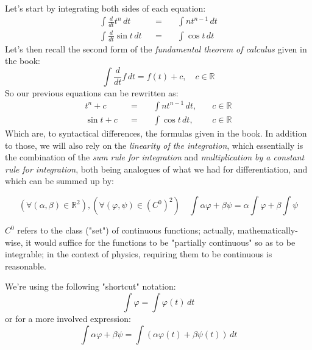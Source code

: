 \documentclass[solutions.tex]{subfiles}
\begin{document}
Let's start by integrating both sides of each equation:
\begin{equation*} \begin{aligned}
	\int\frac{d}{dt}t^n\,dt &&=\quad& \int nt^{n-1}\,dt \\
	\int\frac{d}{dt}\sin t\,dt &&=\quad& \int\cos t\,dt
\end{aligned} \end{equation*}
Let's then recall the second form of the \textit{fundamental
theorem of calculus} given in the book:
\[
	\int\frac{d}{dt}f\,dt = f(t) + c,\quad c\in\mathbb{R}
\]
So our previous equations can be rewritten as:
\begin{equation*} \begin{aligned}
	t^n + c &&=\quad& \int nt^{n-1}\,dt,&\quad c\in\mathbb{R} \\
	\sin t + c &&=\quad& \int\cos t\,dt,&\quad c\in\mathbb{R}
\end{aligned} \end{equation*}
Which are, to syntactical differences, the formulas given in
the book. In addition to those, we will also rely on the
\textit{linearity of the integration}, which essentially
is the combination of the \textit{sum rule for integration}
and \textit{multiplication by a constant rule for integration},
both being analogues of what we had for differentiation, and
which can be summed up by:
\begin{theorem}
\[
	\left(\forall (\alpha,\beta)\in\mathbb{R}^2\right), \left(\forall
	(\varphi,\psi)\in(C^0)^2\right) \quad
		\boxed{\int\alpha\varphi+\beta\psi = \alpha\int\varphi+\beta\int\psi}
\]
\end{theorem}
\begin{remark} $C^0$ refers to the class ("set") of continuous functions;
actually, mathematically-wise, it would suffice for the functions
to be "partially continuous" so as to be integrable; in the context of
physics, requiring them to be continuous is reasonable.
\end{remark}
\begin{remark} We're using the following "shortcut" notation:
\[
	\int\varphi = \int\varphi(t)\,dt
\]
or for a more involved expression:
\[
	\int\alpha\varphi+\beta\psi = \int\left(\alpha\varphi(t)+\beta\psi(t)\right)\,dt
\]
\end{remark}
\end{document}
